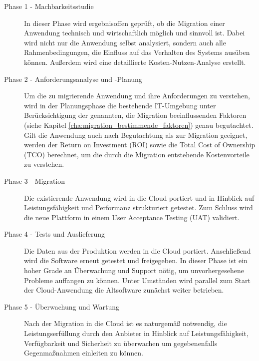 \begin{description}
	\item[Phase 1 - Machbarkeitsstudie] In dieser Phase wird ergebnisoffen 
geprüft, ob die Migration einer Anwendung technisch und wirtschaftlich möglich 
und sinnvoll ist. Dabei wird nicht nur die Anwendung selbst analysiert, sondern 
auch alle Rahmenbedingungen, die Einfluss auf das Verhalten des Systems ausüben 
können. Außerdem wird eine detaillierte Kosten-Nutzen-Analyse erstellt.	

	\item[Phase 2 - Anforderungsanalyse und -Planung] Um die zu migrierende 
Anwendung und ihre Anforderungen zu verstehen, wird in der Planungsphase die 
bestehende IT-Umgebung unter Berücksichtigung der genannten, die Migration 
beeinflussenden Faktoren (siehe  Kapitel 
\ref{cha:migration_bestimmende_faktoren}) 
genau begutachtet. Gilt die Anwendung auch nach Begutachtung als zur Migration 
geeignet, werden der Return on Investment (ROI) sowie die Total Cost of 
Ownership (TCO) berechnet, um die durch die Migration entstehende 
Kostenvorteile 
zu verstehen.
	
	\item[Phase 3 - Migration] Die existierende Anwendung wird in die Cloud 
portiert und in Hinblick auf Leistungsfähigkeit und Performanz strukturiert 
getestet. Zum Schluss wird die neue Plattform in einem User Acceptance Testing 
(UAT) validiert. 
	
	\item[Phase 4 - Tests und Auslieferung] Die Daten aus der Produktion 
werden in die Cloud portiert. Anschließend wird die Software erneut getestet 
und freigegeben. In dieser Phase ist ein hoher Grade an Überwachung und Support 
nötig, um unvorhergesehene Probleme auffangen zu können. Unter Umständen wird 
parallel zum Start der Cloud-Anwendung die Altsoftware zunächst weiter 
betrieben.

	\item[Phase 5 - Überwachung und Wartung] Nach der Migration in die 
Cloud ist es naturgemäß notwendig, die Leistungserfüllung durch den Anbieter in 
Hinblick auf Leistungsfähigkeit, Verfügbarkeit und Sicherheit zu überwachen um 
gegebenenfalls Gegenmaßnahmen einleiten zu können.
\end{description}

